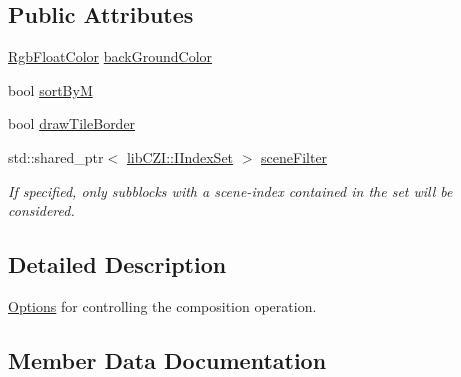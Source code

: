 \subsection*{Public Attributes}
\begin{DoxyCompactItemize}
\item 
\hyperlink{structlib_c_z_i_1_1_rgb_float_color}{Rgb\+Float\+Color} \hyperlink{structlib_c_z_i_1_1_i_single_channel_tile_accessor_1_1_options_a55c96574134736e35182931d4bee4636}{back\+Ground\+Color}
\item 
bool \hyperlink{structlib_c_z_i_1_1_i_single_channel_tile_accessor_1_1_options_a6825901b1c28cff524d5eec48a2ceea3}{sort\+ByM}
\item 
bool \hyperlink{structlib_c_z_i_1_1_i_single_channel_tile_accessor_1_1_options_aa1d7947be1a24339a446efbeb371d34d}{draw\+Tile\+Border}
\item 
\mbox{\label{structlib_c_z_i_1_1_i_single_channel_tile_accessor_1_1_options_a7f07fd78043d3ab587e86a510a088e84}} 
std\+::shared\+\_\+ptr$<$ \hyperlink{classlib_c_z_i_1_1_i_index_set}{lib\+C\+Z\+I\+::\+I\+Index\+Set} $>$ \hyperlink{structlib_c_z_i_1_1_i_single_channel_tile_accessor_1_1_options_a7f07fd78043d3ab587e86a510a088e84}{scene\+Filter}
\begin{DoxyCompactList}\small\item\em If specified, only subblocks with a scene-\/index contained in the set will be considered. \end{DoxyCompactList}\end{DoxyCompactItemize}


\subsection{Detailed Description}
\hyperlink{structlib_c_z_i_1_1_i_single_channel_tile_accessor_1_1_options}{Options} for controlling the composition operation. 

\subsection{Member Data Documentation}
\mbox{\label{structlib_c_z_i_1_1_i_single_channel_tile_accessor_1_1_options_a55c96574134736e35182931d4bee4636}} 
